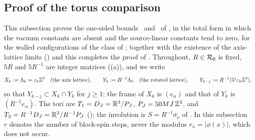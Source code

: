 \providecommand{\Xk}{\ensuremath{X_k}}
\providecommand{\Yk}{\ensuremath{Y_k}}
\providecommand{\hs}{\ensuremath{\hat s}}
\providecommand{\vr}{\ensuremath{\varrho}}
\providecommand{\Bdel}{\ensuremath{(\mathrm B_\Delta)}}
\providecommand{\ipp}[1]{\ensuremath{\langle #1\rangle}}

\subsection{Proof of the torus comparison}\label{ssec:rot:Kproof}

This subsection proves the one-sided bounds \hypFz\ and \hypV\ of , in the total form in which the vacuum constants are absent and the source-linear constants tend to zero, for the walled configurations of the class of ; together with the existence of the axis-lattice limits () and  this completes the proof of . Throughout, $R\in\mathcal R_0$ is fixed, $5R$ and $5R^{-1}$ are integer matrices ((a)), and we write
\[
\Xk\defeq\Lk=\eps_k\Z^3\quad\text{(the axis lattice)},\qquad\Yk\defeq R^{-1}\Lk\quad\text{(the rotated lattice)},\qquad
Y_{k-j}\defeq R^{-1}(5^j\eps_k\Z^3),
\]
so that $Y_{k-j}\subset\Xk\cap\Yk$ for $j\ge1$; the frame of $\Xk$ is $(e_\alpha)$ and that of $\Yk$ is $(R^{-1}e_\alpha)$. The tori are $T_1=D_J=\mathbb R^3/P_J$, $P_J=50MJ\,\mathbb Z^3$, and $T_2=R^{-1}D_J=\mathbb R^3/R^{-1}P_J$ (); the involution is $S=R^{-1}\sigma_\nu$ of . In this subsection $r$ denotes the number of block-spin steps, never the modulus $r_x=|\phi(x)|$, which does not occur.

